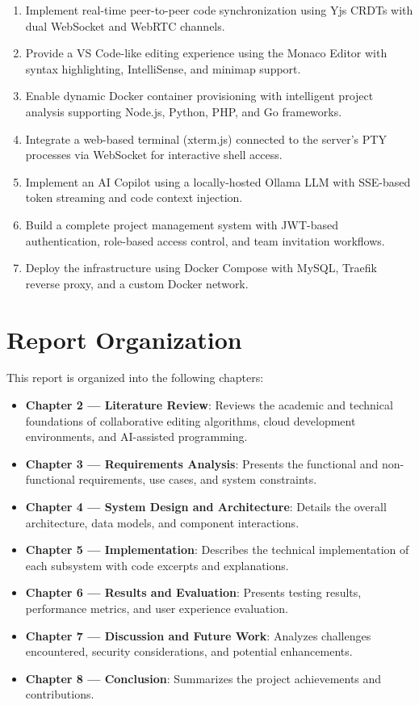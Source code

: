 \documentclass[12pt,a4paper,oneside]{report}
\begin{document}
\begin{enumerate}[label=\arabic*.]
    \item Implement real-time peer-to-peer code synchronization using Yjs CRDTs with dual WebSocket and WebRTC channels.
    \item Provide a VS Code-like editing experience using the Monaco Editor with syntax highlighting, IntelliSense, and minimap support.
    \item Enable dynamic Docker container provisioning with intelligent project analysis supporting Node.js, Python, PHP, and Go frameworks.
    \item Integrate a web-based terminal (xterm.js) connected to the server's PTY processes via WebSocket for interactive shell access.
    \item Implement an AI Copilot using a locally-hosted Ollama LLM with SSE-based token streaming and code context injection.
    \item Build a complete project management system with JWT-based authentication, role-based access control, and team invitation workflows.
    \item Deploy the infrastructure using Docker Compose with MySQL, Traefik reverse proxy, and a custom Docker network.
\end{enumerate}

\section{Report Organization}

This report is organized into the following chapters:

\begin{itemize}
    \item \textbf{Chapter 2 --- Literature Review}: Reviews the academic and technical foundations of collaborative editing algorithms, cloud development environments, and AI-assisted programming.
    \item \textbf{Chapter 3 --- Requirements Analysis}: Presents the functional and non-functional requirements, use cases, and system constraints.
    \item \textbf{Chapter 4 --- System Design and Architecture}: Details the overall architecture, data models, and component interactions.
    \item \textbf{Chapter 5 --- Implementation}: Describes the technical implementation of each subsystem with code excerpts and explanations.
    \item \textbf{Chapter 6 --- Results and Evaluation}: Presents testing results, performance metrics, and user experience evaluation.
    \item \textbf{Chapter 7 --- Discussion and Future Work}: Analyzes challenges encountered, security considerations, and potential enhancements.
    \item \textbf{Chapter 8 --- Conclusion}: Summarizes the project achievements and contributions.
\end{itemize}
\end{document}
